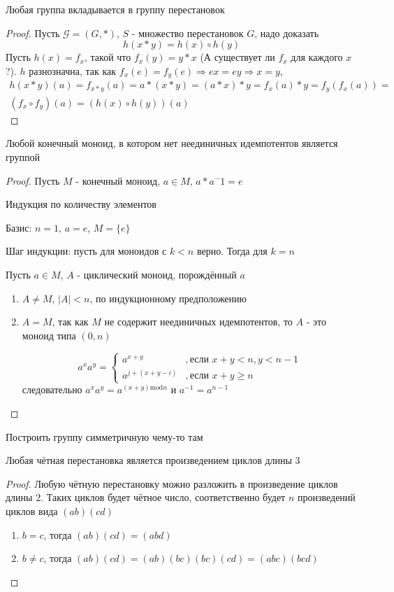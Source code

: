 \documentclass[../main/document.tex]{subfiles}
\begin{document}
\begin{thm}
Любая группа вкладывается в группу перестановок
\begin{proof}
Пусть $\mathcal{G}=(G,*)$, $S$ - множество перестановок $G$, надо доказать
$$h(x*y)=h(x)\circ h(y)$$
Пусть $h(x)=f_x$, такой что $f_x(y)=y*x$ (А существует ли $f_x$ для каждого $x$?). $h$ разнозначна, так как $f_x(e)=f_y(e)\Rightarrow ex=ey\Rightarrow x=y$,
\begin{multline*}
h(x*y)(a)=f_{x*y}(a)=a*(x*y)=(a*x)*y=f_x(a)*y=f_y(f_x(a))=\\
(f_x\circ f_y)(a)=(h(x)\circ h(y))(a)
\end{multline*}
\end{proof}
\end{thm}
\begin{thm}
Любой конечный моноид, в котором нет неединичных идемпотентов является группой
\begin{proof}
Пусть $M$ - конечный моноид, $a\in M$, $a*a^-1=e$

Индукция по количеству элементов

Базис: $n=1$, $a=e$, $M=\{e\}$

Шаг индукции: пусть для моноидов с $k<n$ верно. Тогда для $k=n$

Пусть $a\in M$, $A$ - циклический моноид, порождённый $a$
\begin{enumerate}
\item $A\neq M$, $|A|<n$, по индукционному предположению
\item $A=M$, так как $M$ не содержит неединичных идемпотентов, то $A$ - это моноид типа $(0,n)$ 

$$a^xa^y=\begin{cases} a^{x+y} &,\mbox{если } x+y<n, y<n-1\\
a^{j+(x+y-i)}&,\mbox{если } x+y\geq n\end{cases}$$
следовательно $a^xa^y=a^{(x+y)\mathrm{mod}n}$ и $a^{-1}=a^{n-1}$

\end{enumerate}
\end{proof}
\end{thm}

\begin{exm}
Построить группу симметричную чему-то там
\end{exm}

\begin{thm}
Любая чётная перестановка является произведением циклов длины 3
\begin{proof}
Любую чётную перестановку  можно разложить в произведение циклов длины 2. Таких циклов будет чётное число, соответственно будет $n$ произведений циклов вида $(ab)(cd)$
\begin{enumerate}
\item $b=c$, тогда $(ab)(cd)=(abd)$
\item $b\neq c$, тогда $(ab)(cd)=(ab)(bc)(bc)(cd)=(abc)(bcd)$
\end{enumerate}
\end{proof}
\end{thm}
\end{document}
